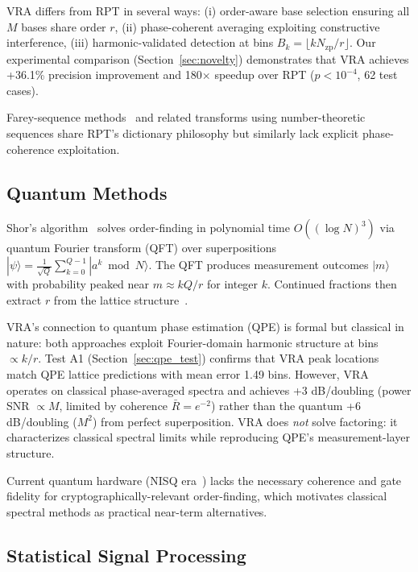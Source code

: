 \documentclass[10pt,twocolumn]{article}
\begin{document}
VRA differs from RPT in several ways: (i) order-aware base selection ensuring all $M$ bases share order $r$, (ii) phase-coherent averaging exploiting constructive interference, (iii) harmonic-validated detection at bins $B_k = \lfloor k N_{\text{zp}}/r \rfloor$. Our experimental comparison (Section~\ref{sec:novelty}) demonstrates that VRA achieves +36.1\% precision improvement and 180$\times$ speedup over RPT ($p < 10^{-4}$, 62 test cases).

Farey-sequence methods~\cite{planat2002} and related transforms using number-theoretic sequences share RPT's dictionary philosophy but similarly lack explicit phase-coherence exploitation.

\subsection{Quantum Methods}

Shor's algorithm~\cite{shor1997} solves order-finding in polynomial time $O((\log N)^3)$ via quantum Fourier transform (QFT) over superpositions $|\psi\rangle = \frac{1}{\sqrt{Q}} \sum_{k=0}^{Q-1} |a^k \bmod N\rangle$. The QFT produces measurement outcomes $|m\rangle$ with probability peaked near $m \approx k Q / r$ for integer $k$. Continued fractions then extract $r$ from the lattice structure~\cite{nielsen2010}.

VRA's connection to quantum phase estimation (QPE) is formal but classical in nature: both approaches exploit Fourier-domain harmonic structure at bins $\propto k/r$. Test A1 (Section~\ref{sec:qpe_test}) confirms that VRA peak locations match QPE lattice predictions with mean error 1.49 bins. However, VRA operates on classical phase-averaged spectra and achieves +3 dB/doubling (power SNR $\propto M$, limited by coherence $\bar{R} = e^{-2}$) rather than the quantum +6 dB/doubling ($M^2$) from perfect superposition. VRA does \emph{not} solve factoring: it characterizes classical spectral limits while reproducing QPE's measurement-layer structure.

Current quantum hardware (NISQ era~\cite{preskill2018}) lacks the necessary coherence and gate fidelity for cryptographically-relevant order-finding, which motivates classical spectral methods as practical near-term alternatives.

\subsection{Statistical Signal Processing}
\end{document}
